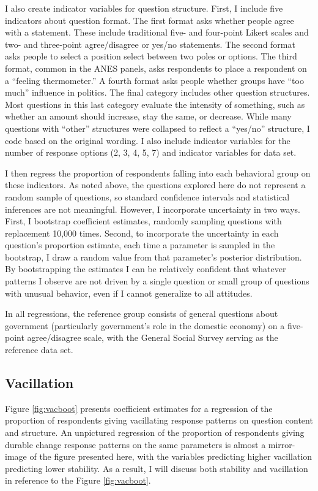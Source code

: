 \documentclass[12pt,]{article}
\begin{document}
I also create indicator variables for question structure. First, I include five indicators about question format. The first format asks whether people agree with a statement. These include traditional five- and four-point Likert scales and two- and three-point agree/disagree or yes/no statements. The second format asks people to select a position select between two poles or options. The third format, common in the ANES panels, asks respondents to place a respondent on a ``feeling thermometer.'' A fourth format asks people whether groups have ``too much'' influence in politics. The final category includes other question structures. Most questions in this last category evaluate the intensity of something, such as whether an amount should increase, stay the same, or decrease. While many questions with ``other'' structures were collapsed to reflect a ``yes/no'' structure, I code based on the original wording. I also include indicator variables for the number of response options (2, 3, 4, 5, 7) and indicator variables for data set.

I then regress the proportion of respondents falling into each behavioral group on these indicators. As noted above, the questions explored here do not represent a random sample of questions, so standard confidence intervals and statistical inferences are not meaningful. However, I incorporate uncertainty in two ways. First, I bootstrap coefficient estimates, randomly sampling questions with replacement 10,000 times. Second, to incorporate the uncertainty in each question's proportion estimate, each time a parameter is sampled in the bootstrap, I draw a random value from that parameter's posterior distribution. By bootstrapping the estimates I can be relatively confident that whatever patterns I observe are not driven by a single question or small group of questions with unusual behavior, even if I cannot generalize to all attitudes.

In all regressions, the reference group consists of general questions about government (particularly government's role in the domestic economy) on a five-point agree/disagree scale, with the General Social Survey serving as the reference data set.

\hypertarget{vacillation}{%
\subsection{Vacillation}\label{vacillation}}

Figure \ref{fig:vacboot} presents coefficient estimates for a regression of the proportion of respondents giving vacillating response patterns on question content and structure. An unpictured regression of the proportion of respondents giving durable change response patterns on the same parameters is almost a mirror-image of the figure presented here, with the variables predicting higher vacillation predicting lower stability. As a result, I will discuss both stability and vacillation in reference to the Figure \ref{fig:vacboot}.
\end{document}
